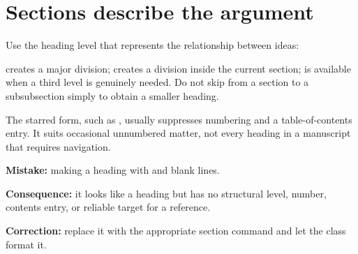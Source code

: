 \section{Sections describe the argument}

Use the heading level that represents the relationship between ideas:


 creates a major division;  creates a division
inside the current section;  is available when a third level
is genuinely needed. Do not skip from a section to a subsubsection simply to
obtain a smaller heading.

The starred form, such as , usually suppresses numbering and a
table-of-contents entry. It suits occasional unnumbered matter, not every
heading in a manuscript that requires navigation.

\begin{commonerror}
\textbf{Mistake:} making a heading with  and blank lines.

\textbf{Consequence:} it looks like a heading but has no structural level,
number, contents entry, or reliable target for a reference.

\textbf{Correction:} replace it with the appropriate section command and let
the class format it.
\end{commonerror}

